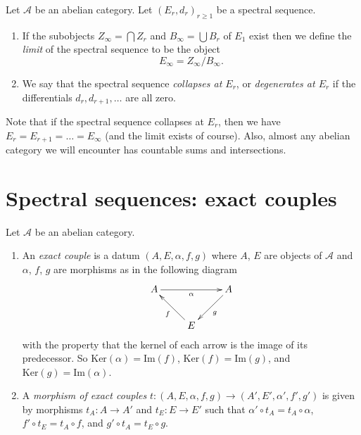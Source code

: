\begin{definition}
\label{definition-limit-spectral-sequence}
Let $\mathcal{A}$ be an abelian category.
Let $(E_r, d_r)_{r \geq 1}$ be a spectral sequence.
\begin{enumerate}
\item If the subobjects $Z_{\infty} = \bigcap Z_r$
and $B_{\infty} = \bigcup B_r$ of $E_1$ exist then we define
the {\it limit} of the spectral sequence to be the object
$$
E_{\infty} = Z_{\infty}/B_{\infty}.
$$
\item We say that the spectral sequence {\it collapses at $E_r$}, or
{\it degenerates at $E_r$} if the differentials $d_r, d_{r + 1}, \ldots$ are
all zero.
\end{enumerate}
\end{definition}

\noindent
Note that if the spectral sequence collapses at $E_r$, then
we have $E_r = E_{r + 1} = \ldots = E_{\infty}$ (and the limit
exists of course). Also, almost any abelian category we will encounter
has countable sums and intersections.











\section{Spectral sequences: exact couples}
\label{section-exact-couple}

\begin{definition}
\label{definition-exact-couple}
Let $\mathcal{A}$ be an abelian category.
\begin{enumerate}
\item An {\it exact couple} is a datum $(A, E, \alpha, f, g)$ where
$A$, $E$ are objects of $\mathcal{A}$ and $\alpha$, $f$, $g$
are morphisms as in the following diagram
$$
\xymatrix{
A \ar[rr]_{\alpha} & & A \ar[ld]^g \\
& E \ar[lu]^f &
}
$$
with the property that the kernel of each arrow is the image
of its predecessor. So $\text{Ker}(\alpha) = \text{Im}(f)$,
$\text{Ker}(f) = \text{Im}(g)$, and $\text{Ker}(g) = \text{Im}(\alpha)$.
\item A {\it morphism of exact couples}
$t : (A, E, \alpha, f, g) \to (A', E', \alpha', f', g')$
is given by morphisms $t_A : A \to A'$ and
$t_E : E \to E'$ such that
$\alpha' \circ t_A = t_A \circ \alpha$,
$f' \circ t_E = t_A \circ f$, and
$g' \circ t_A = t_E \circ g$.
\end{enumerate}
\end{definition}

